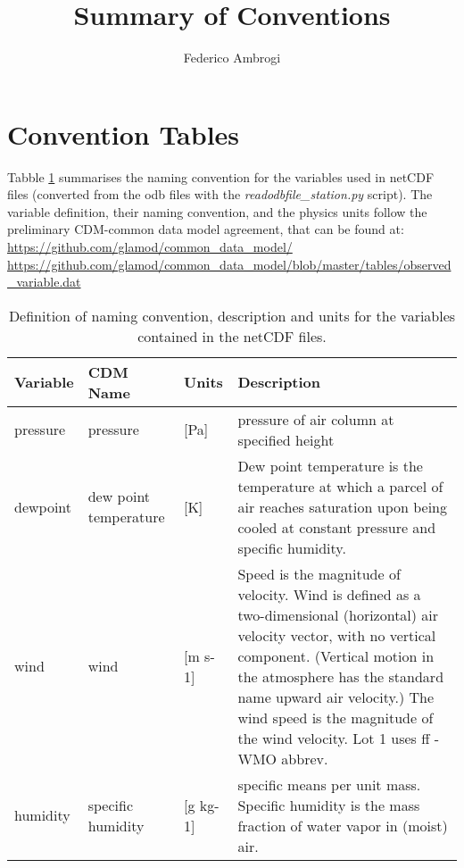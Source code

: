 \documentclass[a4paper,11pt]{article}
\author[a]{Federico Ambrogi}
\title{\boldmath Summary of Conventions}
\begin{document}
 
	\sffamily
	\maketitle
	
	
	
	
\section{Convention Tables}
Tabble \ref{CDM} summarises the naming convention for the variables used in netCDF files (converted from the odb files with the \textit{readodbfile\_station.py} script).
The variable definition, their naming convention, and the physics units follow the preliminary CDM-common data model agreement, that can be found at:
\newline
\url{https://github.com/glamod/common_data_model/}
\newline
\url{https://github.com/glamod/common_data_model/blob/master/tables/observed_variable.dat}





\begin{table}[!htbp]
	\footnotesize
	\begin{center}
		\renewcommand{\arraystretch}{1.3}
		\begin{tabular}{ l l l p{3.5in}}
			\toprule
			\textbf{Variable} & \textbf{CDM Name} & \textbf{Units} & \textbf{Description}  \\ \toprule \toprule
			pressure & pressure & [Pa] & pressure of air column at specified height\\
			dewpoint & dew point temperature & [K] & Dew point temperature is the temperature at which a parcel of air reaches saturation upon being cooled at constant pressure and specific humidity.\\
			wind & wind & [m s-1] & Speed is the magnitude of velocity. Wind is defined as a two-dimensional (horizontal) air velocity vector,  with no vertical component. (Vertical motion in the atmosphere has the standard name upward air velocity.) The wind speed is the magnitude of the wind velocity. Lot 1 uses ff  - WMO abbrev.\\
			humidity & specific humidity & [g kg-1] & specific means per unit mass. Specific humidity is the mass fraction of water vapor in (moist) air.\\
			\bottomrule \bottomrule
		\end{tabular}
	\end{center}
	\caption{Definition of naming convention, description and units for the variables contained in the netCDF files.}
	\label{CDM}
\end{table}
\end{document}
